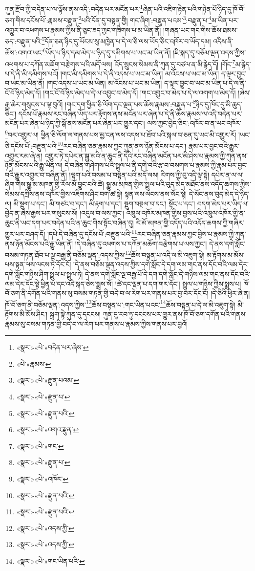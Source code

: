 ཀུན་རྫོབ་ཀྱི་བདེན་པ་ལ་ལྟོས་ནས་འདི་:བདེན་པར་མངོན་པར་\footnote{«སྣར་»«པེ་»བདེན་པར་ཞེས་}ཞེན་པའི་འཇིག་རྟེན་པའི་གཉེན་པོ་ཉིད་དུ་ཁོ་བོ་ཅག་གིས་དངོས་པོ་:རྣམས་བརྫུན་\footnote{«པེ་»རྣམས་}པའི་དོན་དུ་བསྟན་གྱི། གང་ཞིག་:བརྫུན་པའམ་\footnote{«སྣར་»«པེ་»རྫུན་པའམ་}:བརྫུན་པ་\footnote{«སྣར་»«པེ་»རྫུན་པ་}མ་ཡིན་པར་འགྱུར་བ་འཕགས་པ་རྣམས་ཀྱིས་ནི་ཅུང་ཟད་ཀྱང་གཟིགས་པ་མ་ཡིན་ནོ། །གཞན་ཡང་གང་གིས་ཆོས་ཐམས་ཅད་:བརྫུན་པའི་\footnote{«སྣར་»«པེ་»རྫུན་པའི་}དོན་ཅན་ཉིད་དུ་ཡོངས་སུ་མཁྱེན་པ་དེ་ལ་ཅི་ལས་ཡོད་ཅིང་འཁོར་བ་ཡོད་དམ། འདིས་ནི་ཆོས་:འགའ་ཡང་\footnote{«སྣར་»«པེ་»འགའ་རྫུན་}ཡོད་པ་ཉིད་དམ་མེད་པ་ཉིད་དུ་དམིགས་པ་ཡང་མ་ཡིན་ནོ། །ཇི་སྐད་དུ་བཅོམ་ལྡན་འདས་ཀྱིས་འཕགས་པ་དཀོན་མཆོག་བརྩེགས་པའི་མདོ་ལས། འོད་སྲུངས་སེམས་ནི་ཀུན་དུ་བཙལ་ན་མི་རྙེད་དོ། །གོང་\footnote{«སྣར་»«པེ་»གང་}མ་རྙེད་པ་དེ་ནི་མི་དམིགས་པའོ། །གང་མི་དམིགས་པ་དེ་ནི་འདས་པ་ཡང་མ་ཡིན། མ་འོངས་པ་ཡང་མ་ཡིན། ད་ལྟར་བྱུང་བ་ཡང་མ་ཡིན་ནོ། །གང་འདས་པ་ཡང་མ་ཡིན། མ་འོངས་པ་ཡང་མ་ཡིན། ད་ལྟར་བྱུང་བ་ཡང་མ་ཡིན་པ་དེ་ལ་ནི་ངོ་བོ་ཉིད་མེད་དོ། །གང་ངོ་བོ་ཉིད་མེད་པ་དེ་ལ་འབྱུང་བ་མེད་དོ། །གང་འབྱུང་བ་མེད་པ་དེ་ལ་འགག་པ་མེད་དོ། །ཞེས་རྒྱ་ཆེར་གསུངས་པ་ལྟ་བུའོ། །གང་དག་ཕྱིན་ཅི་ལོག་དང་ལྡན་པས་ཆོས་རྣམས་:བརྫུན་པ་\footnote{«སྣར་»«པེ་»རྫུན་པ་}ཉིད་དུ་ཁོང་དུ་མི་ཆུད་ཅིང་། དངོས་པོ་རྣམས་རང་བཞིན་ཡོད་པར་རྟོགས་ནས་མངོན་པར་ཞེན་པ་དེ་ནི་ཆོས་རྣམས་ལ་འདི་བདེན་པར་མངོན་པར་ཞེན་པ་ཉིད་ཀྱི་སྒོ་ནས་མངོན་པར་ཞེན་པར་གྱུར་དང་། ལས་ཀྱང་བྱེད་ཅིང་:འཁོར་བ་ན་ཡང་འཁོར་\footnote{«སྣར་»«པེ་»འཁོར་}བར་འགྱུར་ལ། ཕྱིན་ཅི་ལོག་ལ་གནས་པས་མྱ་ངན་ལས་འདས་པ་ཐོབ་པའི་སྐལ་བ་ཅན་དུ་ཡང་མི་འགྱུར་རོ། །ཡང་ཅི་དངོས་པོ་:བརྫུན་པའི་\footnote{«སྣར་»«པེ་»རྫུན་པའི་}རང་བཞིན་ཅན་རྣམས་ཀྱང་ཀུན་ནས་ཉོན་མོངས་པ་དང་། རྣམ་པར་བྱང་བའི་རྒྱུར་འགྱུར་རམ་ཞེ་ན། འགྱུར་ཏེ་དཔེར་ན་སྒྱུ་མའི་ན་ཆུང་ནི་དེའི་རང་བཞིན་མངོན་པར་མི་ཤེས་པ་རྣམས་ཀྱི་ཀུན་ནས་ཉོན་མོངས་པའི་རྒྱུ་ཡིན་ལ། དེ་བཞིན་གཤེགས་པའི་སྤྲུལ་པ་ནི་དགེ་བའི་རྩ་བ་བསགས་པ་རྣམས་ཀྱི་རྣམ་པར་བྱང་བའི་རྒྱུར་འགྱུར་བ་བཞིན་ནོ། །ལྷག་པའི་བསམ་པ་བསྟན་པའི་མདོ་ལས། རིགས་ཀྱི་བུ་འདི་ལྟ་སྟེ། དཔེར་ན་ལ་ལ་ཞིག་གིས་སྒྱུ་མ་མཁན་གྱི་རོལ་མོ་བྱུང་བའི་ཚེ། སྒྱུ་མ་མཁན་གྱིས་སྤྲུལ་པའི་བུད་མེད་མཐོང་ནས་འདོད་ཆགས་ཀྱིས་སེམས་དཀྲིས་ནས་འཁོར་གྱིས་འཇིགས་ཤིང་བག་ཚ་སྟེ། སྟན་ལས་ལངས་ནས་སོང་སྟེ། དེ་སོང་ནས་བུད་མེད་དེ་ཉིད་ལ། མི་སྡུག་པ་དང་། མི་གཙང་བ་དང་། མི་རྟག་པ་དང་། སྡུག་བསྔལ་བ་དང་། སྟོང་པ་དང་། བདག་མེད་པར་ཡིད་ལ་བྱེད་ན་ཞེས་རྒྱས་པར་གསུངས་སོ། །འདུལ་བ་ལས་ཀྱང་། འཁྲུལ་འཁོར་མཁན་གྱིས་བྱས་པའི་འཁྲུལ་འཁོར་གྱི་ན་ཆུང་ནི་ཡང་དག་པར་བདེན་པའི་ན་ཆུང་གིས་སྟོང་བཞིན་དུ། རི་མོ་མཁན་གྱི་འདོད་པའི་འདོད་ཆགས་ཀྱི་གཞིར་གྱུར་པར་བཤད་དོ། །དཔེ་དེ་བཞིན་དུ་དངོས་པོ་:བརྫུན་པའི་\footnote{«སྣར་»«པེ་»རྫུན་པའི་}རང་བཞིན་ཅན་རྣམས་ཀྱང་བྱིས་པ་རྣམས་ཀྱི་ཀུན་ནས་ཉོན་མོངས་པའི་རྒྱུ་ཡིན་ནོ། །དེ་བཞིན་དུ་འཕགས་པ་དཀོན་མཆོག་བརྩེགས་པ་ལས་ཀྱང་། དེ་ནས་དགེ་སློང་བསམ་གཏན་ཐོབ་པ་ལྔ་བརྒྱ་ནི་བཅོམ་ལྡན་:འདས་ཀྱིས་\footnote{«སྣར་»«པེ་»འདས་ཀྱི་}ཆོས་བསྟན་པ་འདི་ལ་མི་འཇུག་སྟེ། མ་རྟོགས་མ་མོས་པས་སྟན་ལས་ལངས་ཏེ་དོང་ངོ། །དེ་ནས་བཅོམ་ལྡན་འདས་ཀྱིས་དགེ་སློང་དེ་དག་ལམ་གང་ནས་དོང་བའི་ལམ་དེར་དགེ་སློང་གཉིས་ཤིག་སྤྲུལ་པ་སྤྲུལ་ཏེ། དེ་ནས་དགེ་སློང་ལྔ་བརྒྱ་པོ་དེ་དག་དགེ་སློང་དེ་གཉིས་ལམ་གང་ནས་དོང་བའི་ལམ་དེར་དོང་སྟེ་ཕྱིན་པ་དང་འདི་སྐད་ཅེས་སྨྲས་སོ། །ཚེ་དང་ལྡན་པ་དག་གར་དོང་། སྤྲུལ་པ་གཉིས་ཀྱིས་སྨྲས་པ། ཁོ་བོ་ཅག་ནི་དགོན་པའི་གནས་སུ་བསམ་གཏན་གྱི་བདེ་བ་ལ་རེག་པར་གནས་པར་བྱ་བར་དོང་ངོ། །དེ་ཅིའི་ཕྱིར་ཞེ་ན། ཁོ་བོ་ཅག་ནི་བཅོམ་ལྡན་:འདས་ཀྱིས་\footnote{«སྣར་»«པེ་»འདས་ཀྱི་}ཆོས་བསྟན་པ་:གང་ཡིན་པའང་\footnote{«སྣར་»«པེ་»གང་ཡིན་པའི་}ཆོས་བསྟན་པ་དེ་ལ་མི་འཇུག་སྟེ། མི་རྟོགས་མི་མོས་ཤིང་། སྐྲག་སྟེ་ཀུན་དུ་དངངས། ཀུན་དུ་རབ་ཏུ་དངངས་པར་གྱུར་ནས་ཁོ་བོ་ཅག་དགོན་པའི་གནས་རྣམས་སུ་བསམ་གཏན་གྱི་བདེ་བ་ལ་རེག་པར་གནས་པ་རྣམས་ཀྱིས་གནས་པར་བྱའོ། 
